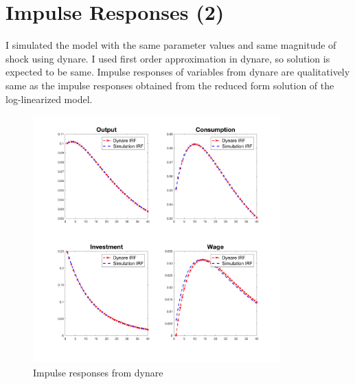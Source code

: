 \documentclass[11pt]{amsart}
\begin{document}
\section{Impulse Responses (2)}
I simulated the model with the same parameter values and same magnitude of shock using dynare. I used first order approximation in dynare, so solution is expected to be same. Impulse responses of variables from dynare are qualitatively same as the impulse responses obtained from the reduced form solution of the log-linearized model. 
\begin{figure}[H]
	\centering
	\includegraphics[width=0.85\textwidth]{6_Minki.png}
	\caption{Impulse responses from dynare}
\end{figure}
\end{document}
